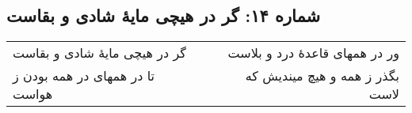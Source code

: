 \begin{center}
\section*{شماره ۱۴: گر در هیچی مایۀ شادی و بقاست}
\label{sec:014}
\begin{longtable}{l p{0.5cm} r}
گر در هیچی مایهٔ شادی و بقاست
&&
ور در همهای قاعدهٔ درد و بلاست
\\
تا در همهای در همه بودن ز هواست
&&
بگذر ز همه و هیچ میندیش که لاست
\\
\end{longtable}
\end{center}
